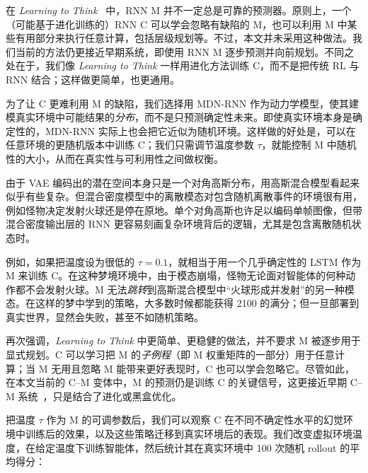 \documentclass{article}
\begin{document}
在 \textit{Learning to Think}~\cite{learning_to_think} 中，RNN M 并不一定总是可靠的预测器。原则上，一个（可能基于进化训练的）RNN C 可以学会忽略有缺陷的 M，也可以利用 M 中某些有用部分来执行任意计算，包括层级规划等。不过，本文并未采用这种做法。我们当前的方法仍更接近早期系统\cite{s05_making_the_world_differentiable,s05a_cm,s05b_rl}，即使用 RNN M 逐步预测并向前规划。不同之处在于，我们像 \textit{Learning to Think} 一样用进化方法训练 C，而不是把传统 RL 与 RNN 结合；这样做更简单，也更通用。

为了让 C 更难利用 M 的缺陷，我们选择用 MDN-RNN 作为动力学模型，使其建模真实环境中可能结果的\textit{分布}，而不是只预测确定性未来。即使真实环境本身是确定性的，MDN-RNN 实际上也会把它近似为随机环境。这样做的好处是，可以在任意环境的更随机版本中训练 C；我们只需调节温度参数 $\tau$，就能控制 M 中随机性的大小，从而在真实性与可利用性之间做权衡。

由于 VAE 编码出的潜在空间本身只是一个对角高斯分布，用高斯混合模型看起来似乎有些复杂。但混合密度模型中的离散模态对包含随机离散事件的环境很有用，例如怪物决定发射火球还是停在原地。单个对角高斯也许足以编码单帧图像，但带混合密度输出层的 RNN 更容易刻画复杂环境背后的逻辑，尤其是包含离散随机状态时。

例如，如果把温度设为很低的 $\tau=0.1$，就相当于用一个几乎确定性的 LSTM 作为 M 来训练 C。在这种梦境环境中，由于模态崩塌，怪物无论面对智能体的何种动作都不会发射火球。M 无法\textit{跳转}到高斯混合模型中“火球形成并发射”的另一种模态。在这样的梦中学到的策略，大多数时候都能获得 2100 的满分；但一旦部署到真实世界，显然会失败，甚至不如随机策略。

再次强调，\textit{Learning to Think} 中更简单、更稳健的做法，并不要求 M 被逐步用于显式规划。C 可以学习把 M 的\textit{子例程}（即 M 权重矩阵的一部分）用于任意计算；当 M 无用且忽略 M 能带来更好表现时，C 也可以学会忽略它。尽管如此，在本文当前的 C--M 变体中，M 的预测仍是训练 C 的关键信号，这更接近早期 C--M 系统~\cite{s05_making_the_world_differentiable,s05a_cm,s05b_rl}，只是结合了进化或黑盒优化。

把温度 $\tau$ 作为 M 的可调参数后，我们可以观察 C 在不同不确定性水平的幻觉环境中训练后的效果，以及这些策略迁移到真实环境后的表现。我们改变虚拟环境温度，在给定温度下训练智能体，然后统计其在真实环境中 100 次随机 rollout 的平均得分：
\end{document}
